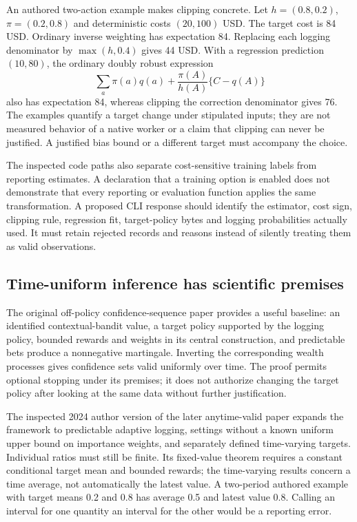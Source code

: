 An authored two-action example makes clipping concrete. Let $h=(0.8,0.2)$, $\pi=(0.2,0.8)$ and deterministic costs $(20,100)$ USD. The target cost is 84 USD. Ordinary inverse weighting has expectation 84. Replacing each logging denominator by $\max(h,0.4)$ gives 44 USD. With a regression prediction $(10,80)$, the ordinary doubly robust expression
\[
 \sum_a\pi(a)q(a)+\frac{\pi(A)}{h(A)}\{C-q(A)\}
\]
also has expectation 84, whereas clipping the correction denominator gives 76. The examples quantify a target change under stipulated inputs; they are not measured behavior of a native worker or a claim that clipping can never be justified. A justified bias bound or a different target must accompany the choice.~\citep{exec24_policycxx_comparison}

The inspected code paths also separate cost-sensitive training labels from reporting estimates. A declaration that a training option is enabled does not demonstrate that every reporting or evaluation function applies the same transformation. A proposed CLI response should identify the estimator, cost sign, clipping rule, regression fit, target-policy bytes and logging probabilities actually used. It must retain rejected records and reasons instead of silently treating them as valid observations.~\citep{exec24_policycxx_vw,exec24_policycxx_comparison}

\subsection{Time-uniform inference has scientific premises}
The original off-policy confidence-sequence paper provides a useful baseline: an identified contextual-bandit value, a target policy supported by the logging policy, bounded rewards and weights in its central construction, and predictable bets produce a nonnegative martingale. Inverting the corresponding wealth processes gives confidence sets valid uniformly over time. The proof permits optional stopping under its premises; it does not authorize changing the target policy after looking at the same data without further justification.~\citep{exec24_policycxx_cs2021}

The inspected 2024 author version of the later anytime-valid paper expands the framework to predictable adaptive logging, settings without a known uniform upper bound on importance weights, and separately defined time-varying targets. Individual ratios must still be finite. Its fixed-value theorem requires a constant conditional target mean and bounded rewards; the time-varying results concern a time average, not automatically the latest value. A two-period authored example with target means 0.2 and 0.8 has average 0.5 and latest value 0.8. Calling an interval for one quantity an interval for the other would be a reporting error.~\citep{exec24_policycxx_anytime2024,exec24_policycxx_comparison}

